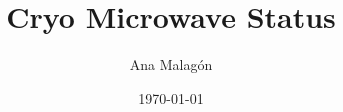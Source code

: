 \documentclass{beamer}
\title{Cryo Microwave Status}
\author{Ana Malag\'on}
\date{\today}
\begin{document}
\frame{\titlepage}


%
\end{document}
